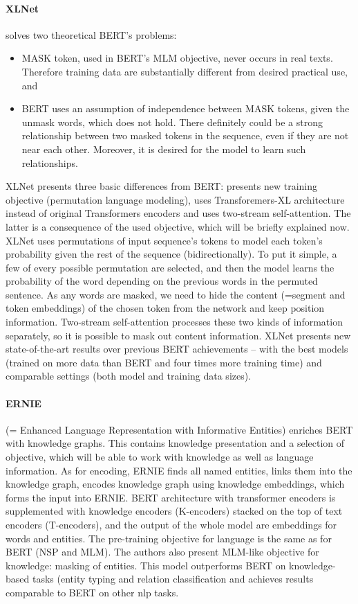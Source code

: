\paragraph{XLNet} \citep{Yang2019a} solves two theoretical BERT's problems:
\begin{itemize}
\item MASK token, used in BERT's MLM objective, never occurs in real texts. Therefore training data are substantially different from desired practical use, and
\item BERT uses an assumption of independence between MASK tokens, given the unmask words, which does not hold. There definitely could be a strong relationship between two masked tokens in the sequence, even if they are not near each other. Moreover, it is desired for the model to learn such relationships.
\end{itemize}
XLNet presents three basic differences from BERT: presents new training objective (permutation language modeling), uses Transforemers-XL \citep{Dai2019} architecture instead of original Transformers encoders and uses two-stream self-attention. The latter is a consequence of the used objective, which will be briefly explained now. XLNet uses permutations of input sequence's tokens to model each token's probability given the rest of the sequence (bidirectionally). To put it simple, a few of every possible permutation are selected, and then the model learns the probability of the word depending on the previous words in the permuted sentence. As any words are masked, we need to hide the content (=segment and token embeddings) of the chosen token from the network and keep position information. Two-stream self-attention processes these two kinds of information separately, so it is possible to mask out content information. XLNet presents new state-of-the-art results over previous BERT achievements -- with the best models (trained on more data than BERT and four times more training time) and comparable settings (both model and training data sizes).
\paragraph{ERNIE} (= Enhanced Language Representation with Informative Entities) \citep{Zhang2019} enriches BERT with knowledge graphs. This contains knowledge presentation and a selection of objective, which will be able to work with knowledge as well as language information. As for encoding, ERNIE finds all named entities, links them into the knowledge graph, encodes knowledge graph using knowledge embeddings, which forms the input into ERNIE. BERT architecture with transformer encoders is supplemented with knowledge encoders (K-encoders) stacked on the top of text encoders (T-encoders), and the output of the whole model are embeddings for words and entities. The pre-training objective for language is the same as for BERT (NSP and MLM). The authors also present MLM-like objective for knowledge: masking of entities. This model outperforms BERT on knowledge-based tasks (entity typing and relation classification and achieves results comparable to BERT on other \acrshort{nlp} tasks.
